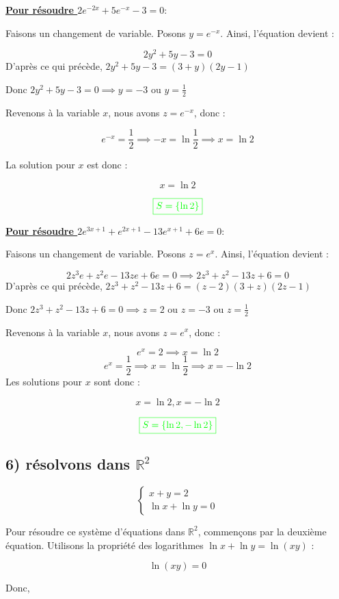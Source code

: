 \documentclass[12pt]{article}
\begin{document}
\textbf{\underline{Pour résoudre \(2e^{-2x} + 5e^{-x} - 3 = 0\)}}:

Faisons un changement de variable. Posons \(y = e^{-x}\). Ainsi, l'équation devient :

\[
2y^2 + 5y - 3 = 0
\]
D'après ce qui précède, $2y^2 + 5y - 3=(3+y)(2y-1)$

Donc $2y^2 + 5y - 3=0 \implies y=-3$ ou $y=\frac{1}{2} $ 

Revenons à la variable \(x\), nous avons \(z = e^{-x}\), donc :

\[
e^{-x} = \frac{1}{2} \implies -x =\ln \frac{1}{2} \implies x =\ln 2
\]

La solution pour \(x\) est donc :

\[
x = \ln 2
\]

\[
\textcolor{green}{\boxed{S=\left\lbrace \ln 2\right\rbrace }}
\]

\textbf{\underline{Pour résoudre \(2e^{3x+1} + e^{2x+1} - 13e^{x+1} + 6e = 0\)}}:

Faisons un changement de variable. Posons \(z = e^{x}\). Ainsi, l'équation devient :

\[
2z^3e + z^2e - 13ze + 6e = 0\implies 2z^3 + z^2 - 13z + 6 = 0
\]
D'après ce qui précède, $2z^3 + z^2 - 13z + 6=(z-2)(3+z)(2z-1)$

Donc $2z^3 + z^2 - 13z + 6=0 \implies z=2$ ou $z=-3 $ ou $z=\frac{1}{2}$

Revenons à la variable \(x\), nous avons \(z = e^{x}\), donc :

\[
e^{x} = 2 \implies x =\ln 2
\]
\[
e^{x} = \frac{1}{2} \implies x =\ln \frac{1}{2} \implies x =-\ln 2
\]
Les solutions pour \(x\) sont donc :

\[
x = \ln 2, x = -\ln 2
\]

\[
\textcolor{green}{\boxed{S=\left\lbrace \ln 2, -\ln 2\right\rbrace }}
\]
\subsection*{6) résolvons dans \(\mathbb{R}^{2}\)} 
\[
\begin{cases}
x + y = 2 \\
\ln x + \ln y = 0
\end{cases}
\]

Pour résoudre ce système d'équations dans \(\mathbb{R}^{2}\), commençons par la deuxième équation. Utilisons la propriété des logarithmes \(\ln x + \ln y = \ln(xy)\) :

\[
\ln(xy) = 0
\]

Donc,
\end{document}
